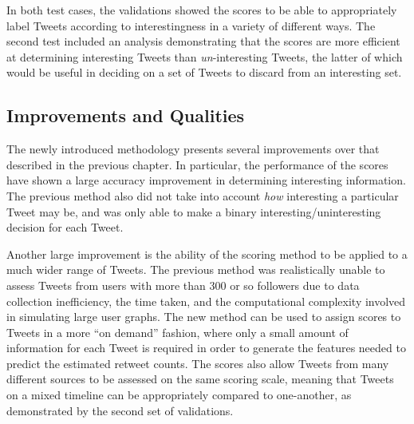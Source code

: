 In both test cases, the validations showed the scores to be able to appropriately label Tweets according to interestingness in a variety of different ways. The second test included an analysis demonstrating that the scores are more efficient at determining interesting Tweets than \textit{un}-interesting Tweets, the latter of which would be useful in deciding on a set of Tweets to discard from an interesting set. 

\subsection{Improvements and Qualities}
The newly introduced methodology presents several improvements over that described in the previous chapter. In particular, the performance of the scores have shown a large accuracy improvement in determining interesting information. The previous method also did not take into account \textit{how} interesting a particular Tweet may be, and was only able to make a binary interesting/uninteresting decision for each Tweet.

Another large improvement is the ability of the scoring method to be applied to a much wider range of Tweets. The previous method was realistically unable to assess Tweets from users with more than 300 or so followers due to data collection inefficiency, the time taken, and the computational complexity involved in simulating large user graphs. The new method can be used to assign scores to Tweets in a more ``on demand'' fashion, where only a small amount of information for each Tweet is required in order to generate the features needed to predict the estimated retweet counts. The scores also allow Tweets from many different sources to be assessed on the same scoring scale, meaning that Tweets on a mixed timeline can be appropriately compared to one-another, as demonstrated by the second set of validations.

